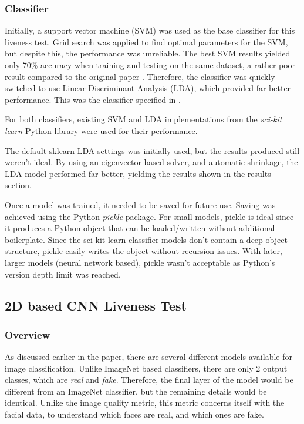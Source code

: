\documentclass[12pt,a4paper]{article}
\begin{document}
        \subsubsection{Classifier}
            Initially, a support vector machine (SVM) was used as the base classifier for this liveness test. Grid search was applied to find optimal parameters for the SVM, but despite this, the performance was unreliable. The best SVM results yielded only 70\% accuracy when training and testing on the same dataset, a rather poor result compared to the original paper \cite{ImageQualityAssessmentTest}. Therefore, the classifier was quickly switched to use Linear Discriminant Analysis (LDA), which provided far better performance. This was the classifier specified in \cite{ImageQualityAssessmentTest}.

            For both classifiers, existing SVM and LDA implementations from the \emph{sci-kit learn} Python library were used for their performance. 
            
            The default sklearn LDA settings was initially used, but the results produced still weren't ideal. By using an eigenvector-based solver, and automatic shrinkage, the LDA model performed far better, yielding the results
            shown in the results section.

            Once a model was trained, it needed to be saved for future use. Saving was achieved using the Python \emph{pickle} package. For small models, pickle is ideal since it produces a Python object that can be loaded/written without additional boilerplate. Since the sci-kit learn classifier models don't contain a deep object structure, pickle easily writes the object without recursion issues. With later, larger models (neural network based), pickle wasn't acceptable as Python's version depth limit was reached.
    
            
        \subsection{2D based CNN Liveness Test}
            \subsubsection{Overview}
            As discussed earlier in the paper, there are several different models available for image classification. Unlike ImageNet based classifiers, there are only 2 output classes, which are \emph{real} and \emph{fake}.
            Therefore, the final layer of the model would be different from an ImageNet classifier, but the remaining details would be identical. Unlike the image quality metric, this metric concerns itself with the facial data, to understand which faces
            are real, and which ones are fake.
\end{document}
